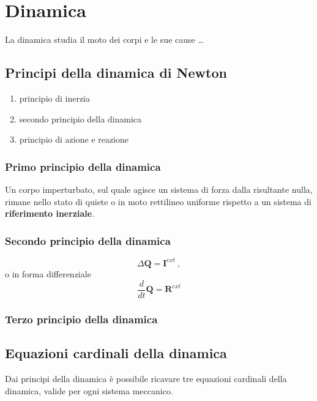 \chapter{Dinamica}\label{mechanics:dynamics}
La dinamica studia il moto dei corpi e le sue cause \dots
\section{Principi della dinamica di Newton}
\begin{enumerate}
  \item principio di inerzia
  \item secondo principio della dinamica
  \item principio di azione e reazione
\end{enumerate}
\subsection{Primo principio della dinamica}
Un corpo imperturbato, sul quale agisce un sistema di forza dalla risultante nulla, rimane nello stato di quiete o in moto rettilineo uniforme rispetto a un sistema di \textbf{riferimento inerziale}.

\noindent
{\color{red}{Cosa intendiamo per sistema di riferimento inerziale?}}

\subsection{Secondo principio della dinamica}
\begin{equation}
    \Delta \mathbf{Q} = \mathbf{I}^{ext} \ ,
\end{equation}
o in forma differenziale
\begin{equation}
    \dfrac{d}{dt}\mathbf{Q} = \mathbf{R}^{ext}
\end{equation}

\subsection{Terzo principio della dinamica}

\section{Equazioni cardinali della dinamica}
Dai principi della dinamica è possibile ricavare tre equazioni cardinali della dinamica, valide per ogni sistema meccanico.
